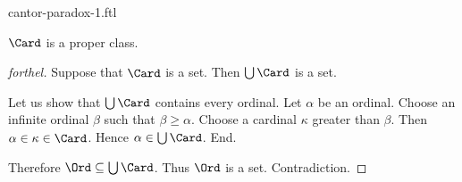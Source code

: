 \documentclass{naproche-library}
\begin{document}
\begin{smodule}{cantor-paradox-1.ftl}

  \begin{theorem*}[forthel,title=Cantor's First Paradox,id=cantor_paradox_1]
    $\Card$ is a proper class.
  \end{theorem*}
  \begin{proof}[forthel]
    Suppose that $\Card$ is a set.
    Then $\bigcup \Card$ is a set.

    Let us show that $\bigcup \Card$ contains every ordinal.
      Let $\alpha$ be an ordinal.
      Choose an infinite ordinal $\beta$ such that $\beta \geq \alpha$.
      Choose a cardinal $\kappa$ greater than $\beta$.
      Then $\alpha \in \kappa \in \Card$.
      Hence $\alpha \in \bigcup \Card$.
    End.

    Therefore $\Ord \subseteq \bigcup \Card$.
    Thus $\Ord$ is a set.
    Contradiction.
  \end{proof}
\end{smodule}
\end{document}
